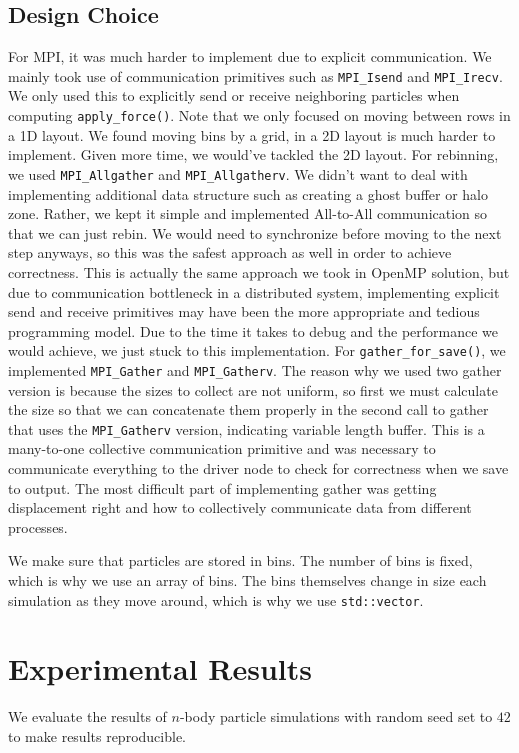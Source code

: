 \documentclass{article}
\begin{document}
\subsection{Design Choice}
For MPI, it was much harder to implement due to explicit communication. We mainly took use of communication primitives such as \verb|MPI_Isend| and \verb|MPI_Irecv|. We only used this to explicitly send or receive neighboring particles when computing \verb|apply_force()|. Note that we only focused on moving between rows in a 1D layout. We found moving bins by a grid, in a 2D layout is much harder to implement. Given more time, we would've tackled the 2D layout. For rebinning, we used \verb|MPI_Allgather| and \verb|MPI_Allgatherv|. We didn't want to deal with implementing additional data structure such as creating a ghost buffer or halo zone. Rather, we kept it simple and implemented All-to-All communication so that we can just rebin. We would need to synchronize before moving to the next step anyways, so this was the safest approach as well in order to achieve correctness. This is actually the same approach we took in OpenMP solution, but due to communication bottleneck in a distributed system, implementing explicit send and receive primitives may have been the more appropriate and tedious programming model. Due to the time it takes to debug and the performance we would achieve, we just stuck to this implementation. For \verb|gather_for_save()|, we implemented \verb|MPI_Gather| and \verb|MPI_Gatherv|. The reason why we used two gather version is because the sizes to collect are not uniform, so first we must calculate the size so that we can concatenate them properly in the second call to gather that uses the \verb|MPI_Gatherv| version, indicating variable length buffer. This is a many-to-one collective communication primitive and was necessary to communicate everything to the driver node to check for correctness when we save to output. The most difficult part of implementing gather was getting displacement right and how to collectively communicate data from different processes.

We make sure that particles are stored in bins. The number of bins is fixed, which is why we use an array of bins. The bins themselves change in size each simulation as they move around, which is why we use \verb|std::vector|.

\section{Experimental Results}
We evaluate the results of $n$-body particle simulations with random seed set to $42$ to make results reproducible.
\end{document}
